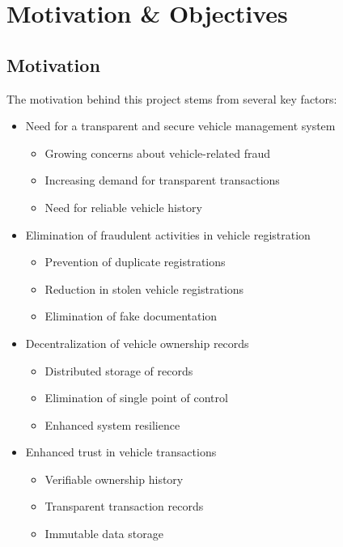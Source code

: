 \documentclass[12pt,a4paper]{article}
\begin{document}
    \section{Motivation \& Objectives}

    \subsection{Motivation}
    The motivation behind this project stems from several key factors:

    \begin{itemize}
        \item Need for a transparent and secure vehicle management system
        \begin{itemize}
            \item Growing concerns about vehicle-related fraud
            \item Increasing demand for transparent transactions
            \item Need for reliable vehicle history
        \end{itemize}

        \item Elimination of fraudulent activities in vehicle registration
        \begin{itemize}
            \item Prevention of duplicate registrations
            \item Reduction in stolen vehicle registrations
            \item Elimination of fake documentation
        \end{itemize}

        \item Decentralization of vehicle ownership records
        \begin{itemize}
            \item Distributed storage of records
            \item Elimination of single point of control
            \item Enhanced system resilience
        \end{itemize}

        \item Enhanced trust in vehicle transactions
        \begin{itemize}
            \item Verifiable ownership history
            \item Transparent transaction records
            \item Immutable data storage
        \end{itemize}
    \end{itemize}
\end{document}

